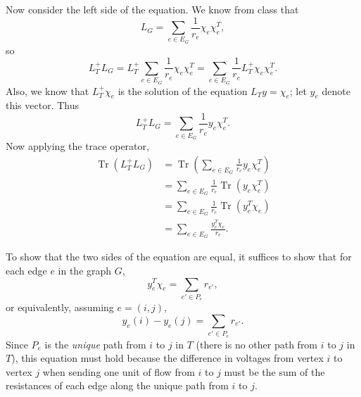 \documentclass{article}
\newcommand{\0}{\mathbf{0}}
\DeclareMathOperator{\Tr}{Tr}
\begin{document}
\begin{enumerate}
\begin{enumerate}
    Now consider the left side of the equation.
    We know from class that
    \begin{equation*}
      L_G = \sum_{e \in E_G} \frac{1}{r_e} \chi_e \chi_e^T,
    \end{equation*}
    so
    \begin{equation*}
      L_T^+ L_G = L_T^+ \sum_{e \in E_G} \frac{1}{r_e} \chi_e \chi_e^T = \sum_{e \in E_G} \frac{1}{r_e} L_T^+ \chi_e \chi_e^T.
    \end{equation*}
    Also, we know that $L_T^+ \chi_e$ is the solution of the equation $L_T y = \chi_e$; let $y_e$ denote this vector.
    Thus
    \begin{equation*}
      L_T^+ L_G = \sum_{e \in E_G} \frac{1}{r_e} y_e \chi_e^T.
    \end{equation*}
    Now applying the trace operator,
    \begin{align*}
      \Tr(L_T^+ L_G) & = \Tr\left(\sum_{e \in E_G} \frac{1}{r_e} y_e \chi_e^T\right) \\
      & = \sum_{e \in E_G} \frac{1}{r_e} \Tr(y_e \chi_e^T) \\
      & = \sum_{e \in E_G} \frac{1}{r_e} \Tr(y_e^T \chi_e) \\
      & = \sum_{e \in E_G} \frac{y_e^T \chi_e}{r_e}.
    \end{align*}

    To show that the two sides of the equation are equal, it suffices to show that for each edge $e$ in the graph $G$,
    \begin{equation*}
      y_e^T \chi_e = \sum_{e' \in P_e} r_{e'},
    \end{equation*}
    or equivalently, assuming $e = (i, j)$,
    \begin{equation*}
      y_e(i) - y_e(j) = \sum_{e' \in P_e} r_{e'}.
    \end{equation*}
    Since $P_e$ is the \emph{unique} path from $i$ to $j$ in $T$ (there is no other path from $i$ to $j$ in $T$), this equation must hold because the difference in voltages from vertex $i$ to vertex $j$ when sending one unit of flow from $i$ to $j$ must be the sum of the resistances of each edge along the unique path from $i$ to $j$.
  \end{enumerate}
\end{enumerate}

\printbibliography
\end{document}
